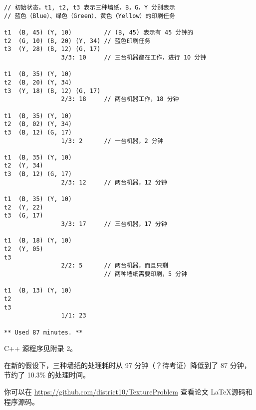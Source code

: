 \documentclass[bwprint]{cumcmthesis}    %
\begin{document}

\vspace{1.5cm}
\begin{lstlisting}[frame=single]
// 初始状态，t1, t2, t3 表示三种墙纸，B，G，Y 分别表示
// 蓝色（Blue）、绿色（Green）、黄色（Yellow）的印刷任务

t1  (B, 45) (Y, 10)         // (B, 45) 表示有 45 分钟的
t2  (G, 10) (B, 20) (Y, 34) // 蓝色印刷任务
t3  (Y, 28) (B, 12) (G, 17)
                3/3: 10     // 三台机器都在工作，进行 10 分钟

t1  (B, 35) (Y, 10)
t2  (B, 20) (Y, 34)
t3  (Y, 18) (B, 12) (G, 17)
                2/3: 18     // 两台机器工作，18 分钟

t1  (B, 35) (Y, 10)
t2  (B, 02) (Y, 34)
t3  (B, 12) (G, 17)
                1/3: 2      // 一台机器，2 分钟

t1  (B, 35) (Y, 10)
t2  (Y, 34)
t3  (B, 12) (G, 17)
                2/3: 12     // 两台机器，12 分钟

t1  (B, 35) (Y, 10)
t2  (Y, 22)
t3  (G, 17)
                3/3: 17     // 三台机器，17 分钟

t1  (B, 18) (Y, 10)
t2  (Y, 05)
t3
                2/2: 5      // 两台机器，而且只剩
                            // 两种墙纸需要印刷，5 分钟

t1  (B, 13) (Y, 10)
t2
t3
                1/1: 23

** Used 87 minutes. **
\end{lstlisting}

C++ 源程序见附录 2。

在新的假设下，三种墙纸的处理耗时从 97 分钟（？待考证）降低到了 87 分钟，节约了
10.3\% 的处理时间。

你可以在 \href{https://github.com/district10/TextureProblem}{https://github.com/district10/TextureProblem}
查看论文 \LaTeX 源码和程序源码。
\end{document}
